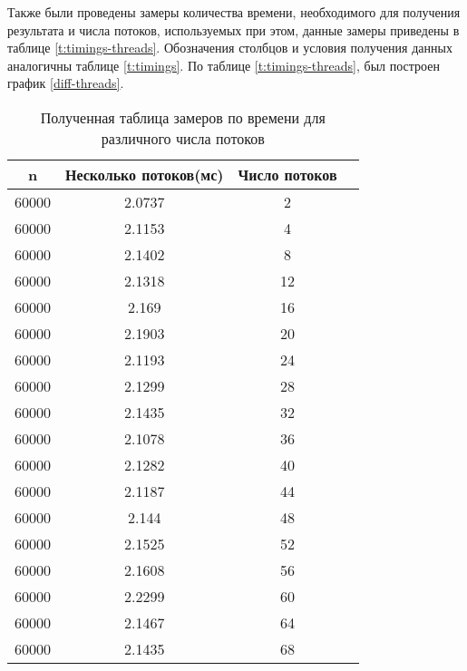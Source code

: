 Также были проведены замеры количества времени, необходимого для получения результата
и числа потоков, используемых при этом, данные замеры приведены в таблице \ref{t:timings-threads}.
Обозначения столбцов и условия получения данных аналогичны таблице \ref{t:timings}. По таблице  \ref{t:timings-threads}, был построен график \ref{diff-threads}.


\begin{table}[ht]
	\centering
	\caption{Полученная таблица замеров по времени для различного числа потоков}
	\begin{tabular}{|c|c|c|c|}
		\hline
		n     & Несколько потоков(мс) & Число потоков \\ \hline
		60000 & 2.0737                            & 2             \\ \hline
		60000 & 2.1153                            & 4             \\ \hline
		60000 & 2.1402                            & 8             \\ \hline
		60000 & 2.1318                            & 12            \\ \hline
		60000 & 2.169                             & 16            \\ \hline
		60000 & 2.1903                            & 20            \\ \hline
		60000 & 2.1193                            & 24            \\ \hline
		60000 & 2.1299                            & 28            \\ \hline
		60000 & 2.1435                            & 32            \\ \hline
		60000 & 2.1078                            & 36            \\ \hline
		60000 & 2.1282                            & 40            \\ \hline
		60000 & 2.1187                            & 44            \\ \hline
		60000 & 2.144                             & 48            \\ \hline
		60000 & 2.1525                            & 52            \\ \hline
		60000 & 2.1608                            & 56            \\ \hline
		60000 & 2.2299                            & 60            \\ \hline
		60000 & 2.1467                            & 64            \\ \hline
		60000 & 2.1435                            & 68            \\ \hline

\end{tabular}
\end{table}
